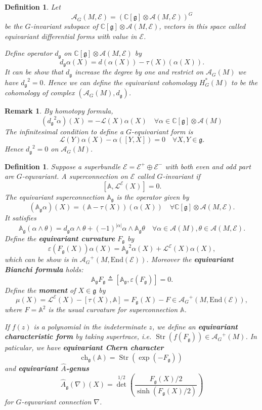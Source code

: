 \documentclass[11pt]{amsart}
\newtheorem{Def}[Thm]{Definition}
\newtheorem{Rmk}[Thm]{Remark}
\def\cA{{\mathcal{A}}}
\def\cAg{{\mathcal{A}_G}}
\def\cL{{\mathcal{L}}}
\def\cLE{\cL^\cE}
\def\cE{{\mathcal{E}}}
\def\bC{{\mathbb{C}}}
\def\bA{{\mathbb{A}}}
\def\bAg{{\mathbb{A}_\mathfrak{g}}}
\def\Fg{{F_{\fgg}}}
\def\fgg{{\mathfrak{g}}}
\def\dg{{d_{\fgg}}}
\def\End{{\mathrm{End}}}
\def\Str{\mathop{\mathrm{Str}}}
\def\kw#1{{\bf \em #1}}
\def\ch{\mathrm{ch}}
\def\Ah{{\hat{A}}}
\def\chg{\ch_\fgg}
\def\Ahg{\Ah_\fgg}
\begin{document}
\begin{Def}
Let 
\[
\cA_G(M,\cE) = \left(\bC[\fgg]\otimes \cA(M,\cE)\right)^G
\]
be the $G$-invariant subspace of $\bC[\fgg]\otimes \cA(M,\cE)$, vectors in this space called equivariant differential forms with value in $\cE$.

Define operator $\dg$ on $\bC[\fgg]\otimes \cA(M,\cE)$ by
\[
\dg \alpha(X) = d(\alpha(X)) - \tau(X)(\alpha(X)).
\]
It can be show that $\dg$ increase the degree by one and restrict on 
$\cAg(M)$ we have $\dg^2= 0$. Hence we can define
the equivariant cohomology $H_G^*(M)$ to be the cohomology of complex $\left(\cAg(M),\dg\right)$.
\end{Def}

\begin{Rmk}
By homotopy formula,
\[
(\dg^2 \alpha)(X) = - \cL(X)\alpha(X)\quad \forall \alpha
\in \bC[\fgg]\otimes \cA(M)
\]
The infinitesimal condition to define a $G$-equivariant form is 
\[
\cL(Y)\alpha(X) - \alpha([Y,X]) = 0 \quad \forall X,Y \in \fgg.
\]
Hence $\dg^2 = 0$ on $\cAg(M)$.
\end{Rmk}

\begin{Def}
Suppose a superbundle $\cE = \cE^+\oplus \cE^-$ 
with both even and odd part are $G$-equvariant.
A superconnection on $\cE$ called $G$-invariant if 
\[
[\bA,\cL^\cE(X)]=0.
\]
The equivariant superconnection $\bAg$ is the operator given by 
\[
(\bAg \alpha)(X) = (\bA-\tau(X))(\alpha(X)) \quad \forall  \bC[\fgg]\otimes \cA(M,\cE).
\]
It satisfies \[
\bAg(\alpha\wedge \theta) = \dg \alpha \wedge \theta +
(-1)^{|\alpha|}\alpha\wedge \bAg\theta \quad \forall\alpha \in \cA(M),
\theta \in \cA(M,\cE).
\]
Define the \kw{equivariant curvature} $\Fg$ by
\[
\varepsilon(\Fg(X))\alpha(X) = \bAg^2\alpha(X) + \cL^\cE(X)\alpha(X),
\] 
which can be show is in $\cAg^+(M,\End(\cE))$.
Moreover the \kw{equivariant Bianchi formula} holds:
\[
\bAg\Fg \triangleq [\bAg,\varepsilon(\Fg)] = 0.
\]
Define the \kw{moment} of $X\in \fgg$ by 
\[
\mu(X) = \cLE(X) - [\tau(X),\bA] = \Fg(X) - F \in \cAg^+(M,\End(\cE)),
\]
where $F = \bA^2$ is the usual curvature for superconnection $\bA$.

If $f(z)$ is a polynomial in the indeterminate $z$, we define an
\kw{equivariant characteristic form} by taking supertrace,
i.e. $\Str(f(\Fg)) \in \cAg^+(M)$. In paticular, we have
\kw{equivariant Chern character} 
\[\chg(\bA) = \Str(\exp(-\Fg))
\]
 and
\kw{equivariant $\Ah$-genus} 
\[
\Ahg(\nabla)(X) =
{\det}^{1/2}\left(\frac{\Fg(X)/2}{\sinh(\Fg(X)/2)}\right)
\]
for $G$-equvariant connection $\nabla$.
\end{Def}
\end{document}
